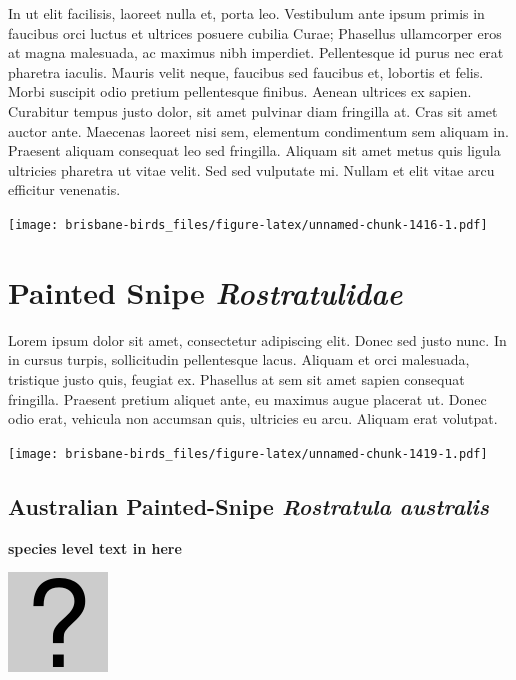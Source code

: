 \documentclass[]{book}
\let\origfigure\figure
\let\endorigfigure\endfigure
\renewenvironment{figure}[1][2] {
  \expandafter\origfigure\expandafter[H]
} {
  \endorigfigure
}
\begin{document}
In ut elit facilisis, laoreet nulla et, porta leo. Vestibulum ante ipsum
primis in faucibus orci luctus et ultrices posuere cubilia Curae;
Phasellus ullamcorper eros at magna malesuada, ac maximus nibh
imperdiet. Pellentesque id purus nec erat pharetra iaculis. Mauris velit
neque, faucibus sed faucibus et, lobortis et felis. Morbi suscipit odio
pretium pellentesque finibus. Aenean ultrices ex sapien. Curabitur
tempus justo dolor, sit amet pulvinar diam fringilla at. Cras sit amet
auctor ante. Maecenas laoreet nisi sem, elementum condimentum sem
aliquam in. Praesent aliquam consequat leo sed fringilla. Aliquam sit
amet metus quis ligula ultricies pharetra ut vitae velit. Sed sed
vulputate mi. Nullam et elit vitae arcu efficitur venenatis.

\begin{figure}
\centering
\texttt{[image: brisbane-birds\_files/figure-latex/unnamed-chunk-1416-1.pdf]}
\caption{\label{fig:unnamed-chunk-1416}insert figure caption}
\end{figure}

\chapter{\texorpdfstring{Painted Snipe
\emph{Rostratulidae}}{Painted Snipe Rostratulidae}}\label{painted-snipe-rostratulidae}

Lorem ipsum dolor sit amet, consectetur adipiscing elit. Donec sed justo
nunc. In in cursus turpis, sollicitudin pellentesque lacus. Aliquam et
orci malesuada, tristique justo quis, feugiat ex. Phasellus at sem sit
amet sapien consequat fringilla. Praesent pretium aliquet ante, eu
maximus augue placerat ut. Donec odio erat, vehicula non accumsan quis,
ultricies eu arcu. Aliquam erat volutpat.

\texttt{[image: brisbane-birds\_files/figure-latex/unnamed-chunk-1419-1.pdf]}

\section{\texorpdfstring{Australian Painted-Snipe \emph{Rostratula
australis}}{Australian Painted-Snipe Rostratula australis}}\label{australian-painted-snipe-rostratula-australis}

\textbf{species level text in here}

\begin{figure}
\centering
\includegraphics{assets/missing.png}
\caption{No image for species}
\end{figure}
\end{document}
